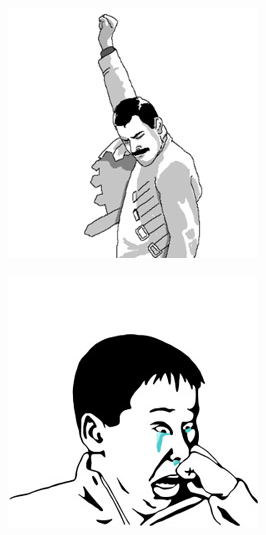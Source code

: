 \begin{multicols}{8}
\begin{center}
\includegraphics[width=\linewidth]{./IMG-GIT/MEMES/Meme-Faces-34.jpg}  
\end{center}

\begin{center}
\includegraphics[width=\linewidth]{./IMG-GIT/MEMES/Meme-Faces-43.jpg}  
\end{center}


\end{multicols}
